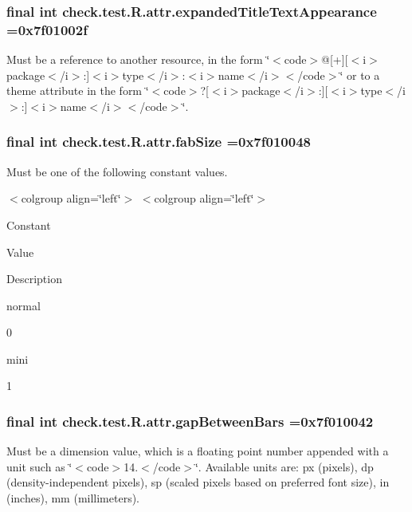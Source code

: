 \subsubsection[{expanded\+Title\+Text\+Appearance}]{\setlength{\rightskip}{0pt plus 5cm}final int check.\+test.\+R.\+attr.\+expanded\+Title\+Text\+Appearance =0x7f01002f\hspace{0.3cm}{\ttfamily [static]}}\label{classcheck_1_1test_1_1_r_1_1attr_ae18599f9e5ed90eeaacf5b1b78f48d22}
Must be a reference to another resource, in the form \char`\"{}$<$code$>$@\mbox{[}+\mbox{]}\mbox{[}$<$i$>$package$<$/i$>$\+:\mbox{]}$<$i$>$type$<$/i$>$\+:$<$i$>$name$<$/i$>$$<$/code$>$\char`\"{} or to a theme attribute in the form \char`\"{}$<$code$>$?\mbox{[}$<$i$>$package$<$/i$>$\+:\mbox{]}\mbox{[}$<$i$>$type$<$/i$>$\+:\mbox{]}$<$i$>$name$<$/i$>$$<$/code$>$\char`\"{}. \hypertarget{classcheck_1_1test_1_1_r_1_1attr_af156d88227185ae6207b4c9fd3d86037}{}
\subsubsection[{fab\+Size}]{\setlength{\rightskip}{0pt plus 5cm}final int check.\+test.\+R.\+attr.\+fab\+Size =0x7f010048\hspace{0.3cm}{\ttfamily [static]}}\label{classcheck_1_1test_1_1_r_1_1attr_af156d88227185ae6207b4c9fd3d86037}
Must be one of the following constant values.

\begin{TabularC}{0}
\hline
\end{TabularC}
$<$colgroup align=\char`\"{}left\char`\"{}$>$ $<$colgroup align=\char`\"{}left\char`\"{}$>$ 

Constant

Value

Description 

{\ttfamily normal}

0

{\ttfamily mini}

1\hypertarget{classcheck_1_1test_1_1_r_1_1attr_ad145c34b60189d9c7ef95b0b8169ebcb}{}
\subsubsection[{gap\+Between\+Bars}]{\setlength{\rightskip}{0pt plus 5cm}final int check.\+test.\+R.\+attr.\+gap\+Between\+Bars =0x7f010042\hspace{0.3cm}{\ttfamily [static]}}\label{classcheck_1_1test_1_1_r_1_1attr_ad145c34b60189d9c7ef95b0b8169ebcb}
Must be a dimension value, which is a floating point number appended with a unit such as \char`\"{}$<$code$>$14.\+5sp$<$/code$>$\char`\"{}. Available units are\+: px (pixels), dp (density-\/independent pixels), sp (scaled pixels based on preferred font size), in (inches), mm (millimeters). 

